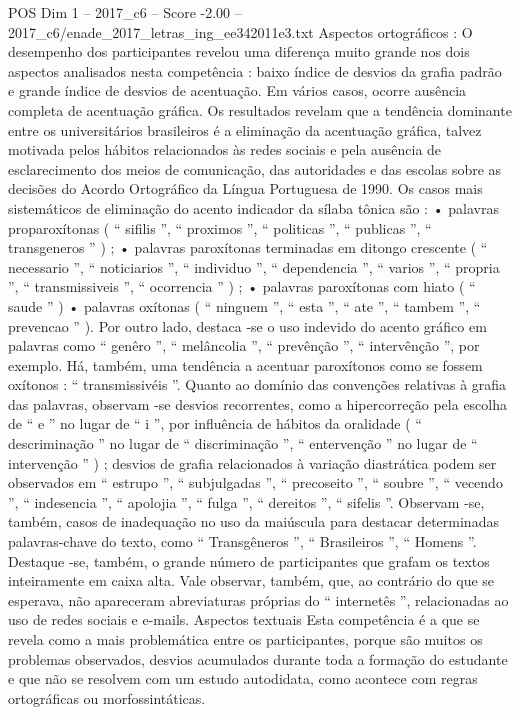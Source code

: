 \begin{textsample}{POS Dim 1 – 2017\_c6 – Score -2.00 – 2017\_c6/enade\_2017\_letras\_ing\_ee342011e3.txt}
Aspectos ortográficos : O desempenho dos participantes revelou uma diferença muito grande nos dois aspectos analisados nesta competência : baixo índice de desvios da grafia padrão e grande índice de desvios de acentuação.
Em vários casos, ocorre ausência completa de acentuação gráfica.
Os resultados revelam que a tendência dominante entre os universitários brasileiros é a eliminação da acentuação gráfica, talvez motivada pelos hábitos relacionados às redes sociais e pela ausência de esclarecimento dos meios de comunicação, das autoridades e das escolas sobre as decisões do Acordo Ortográfico da Língua Portuguesa de 1990.
Os casos mais sistemáticos de eliminação do acento indicador da sílaba tônica são : • palavras proparoxítonas ( “ sifilis ”, “ proximos ”, “ politicas ”, “ publicas ”, “ transgeneros ” ) ; • palavras paroxítonas terminadas em ditongo crescente ( “ necessario ”, “ noticiarios ”, “ individuo ”, “ dependencia ”, “ varios ”, “ propria ”, “ transmissiveis ”, “ ocorrencia ” ) ; • palavras paroxítonas com hiato ( “ saude ” ) • palavras oxítonas ( “ ninguem ”, “ esta ”, “ ate ”, “ tambem ”, “ prevencao ” ).
Por outro lado, destaca -se o uso indevido do acento gráfico em palavras como “ genêro ”, “ melâncolia ”, “ prevênção ”, “ intervênção ”, por exemplo.
Há, também, uma tendência a acentuar paroxítonos como se fossem oxítonos : “ transmissivéis ”.
Quanto ao domínio das convenções relativas à grafia das palavras, observam -se desvios recorrentes, como a hipercorreção pela escolha de “ e ” no lugar de “ i ”, por influência de hábitos da oralidade ( “ descriminação ” no lugar de “ discriminação ”, “ entervenção ” no lugar de “ intervenção ” ) ; desvios de grafia relacionados à variação diastrática podem ser observados em “ estrupo ”, “ subjulgadas ”, “ precoseito ”, “ soubre ”, “ vecendo ”, “ indesencia ”, “ apolojia ”, “ fulga ”, “ dereitos ”, “ sifelis ”.
Observam -se, também, casos de inadequação no uso da maiúscula para destacar determinadas palavras-chave do texto, como “ Transgêneros ”, “ Brasileiros ”, “ Homens ”.
Destaque -se, também, o grande número de participantes que grafam os textos inteiramente em caixa alta.
Vale observar, também, que, ao contrário do que se esperava, não apareceram abreviaturas próprias do “ internetês ”, relacionadas ao uso de redes sociais e e-mails.
Aspectos textuais Esta competência é a que se revela como a mais problemática entre os participantes, porque são muitos os problemas observados, desvios acumulados durante toda a formação do estudante e que não se resolvem com um estudo autodidata, como acontece com regras ortográficas ou morfossintáticas.

\end{textsample}
